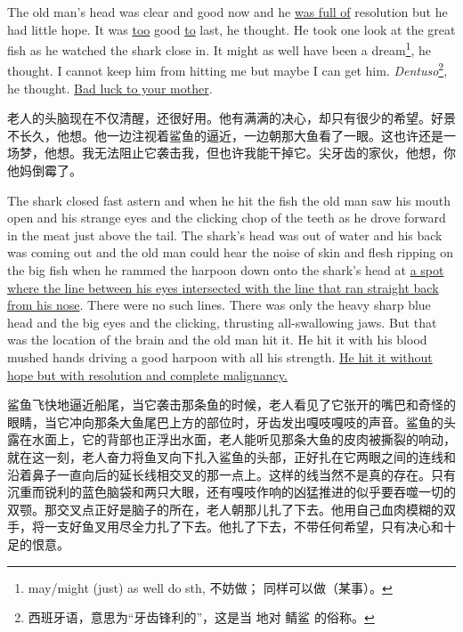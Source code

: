 \begin{paracol}{2}
\switchcolumn*

The old man's head was clear and good now and he \uline{was full of} resolution
but he had little hope. It was \uline{too} good \uline{to} last, he thought. He
took one look at the great fish as he watched the shark close in. It might
as well have been a dream\footnote{may/might (just) as well do sth, 不妨做；
  同样可以做（某事）。}, he thought. I cannot keep him from hitting me but
maybe I can get him. \emph{Dentuso}\footnote{西班牙语，意思为“牙齿锋利的”，这是当
  地对 鲭鲨 的俗称。}, he thought. \uline{Bad luck to your mother}.

\switchcolumn

老人的头脑现在不仅清醒，还很好用。他有满满的决心，却只有很少的希望。好景不长久，他想。他一边注视着鲨鱼的逼近，一边朝那大鱼看了一眼。这也许还是一场梦，他想。我无法阻止它袭击我，但也许我能干掉它。尖牙齿的家伙，他想，你他妈倒霉了。

\switchcolumn*

The shark closed fast astern and when he hit the fish the old man saw his
mouth open and his strange eyes and the clicking chop of the teeth as he
drove forward in the meat just above the tail. The shark's head was out of
water and his back was coming out and the old man could hear the noise of
skin and flesh \gls{ripping} on the big fish when he \gls{rammed} the
harpoon down onto the shark's head at \uline{a spot where the line between his
  eyes \gls{intersected} with the line that ran straight back from his nose}.
There were no such lines. There was only the heavy sharp blue head and the
big eyes and the clicking, thrusting all-\gls{swallowing} jaws. But
that was the \gls{location} of the brain and the old man hit it. He hit it
with his blood \gls{mushed} hands driving a good harpoon with all his
strength. \uline{He hit it without hope but with resolution and complete
\gls{malignancy}.}

\switchcolumn

鲨鱼飞快地逼近船尾，当它袭击那条鱼的时候，老人看见了它张开的嘴巴和奇怪的眼睛，当它冲向那条大鱼尾巴上方的部位时，牙齿发出嘎吱嘎吱的声音。鲨鱼的头露在水面上，它的背部也正浮出水面，老人能听见那条大鱼的皮肉被撕裂的响动，就在这一刻，老人奋力将鱼叉向下扎入鲨鱼的头部，正好扎在它两眼之间的连线和沿着鼻子一直向后的延长线相交叉的那一点上。这样的线当然不是真的存在。只有沉重而锐利的蓝色脑袋和两只大眼，还有嘎吱作响的凶猛推进的似乎要吞噬一切的双颚。那交叉点正好是脑子的所在，老人朝那儿扎了下去。他用自己血肉模糊的双手，将一支好鱼叉用尽全力扎了下去。他扎了下去，不带任何希望，只有决心和十足的恨意。


\end{paracol}
